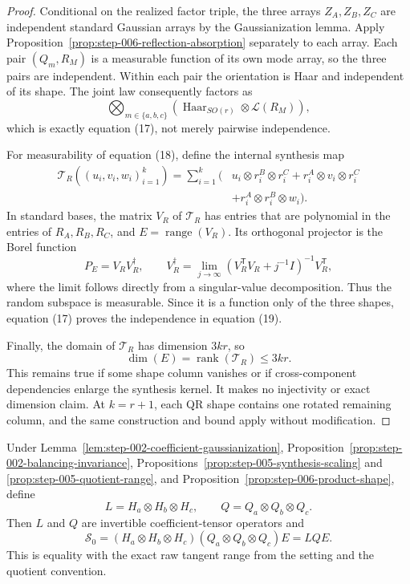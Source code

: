 \begin{proof}
Conditional on the realized factor triple, the
three arrays \(Z_A,Z_B,Z_C\) are independent standard Gaussian arrays by the
Gaussianization lemma. Apply
Proposition~\ref{prop:step-006-reflection-absorption} separately to each
array. Each pair \((Q_m,R_M)\) is a measurable function of its own mode array,
so the three pairs are independent. Within each pair the orientation is Haar
and independent of its shape. The joint law consequently factors as
\[
  \bigotimes_{m\in\{a,b,c\}}
    \left(\operatorname{Haar}_{SO(r)}\otimes\mathcal L(R_M)\right),
\]
which is exactly equation (17), not merely pairwise independence.

For measurability of equation (18), define the internal synthesis map
\[
\begin{aligned}
  \mathcal T_R((u_i,v_i,w_i)_{i=1}^k)
  =\sum_{i=1}^k(&u_i\otimes r_i^B\otimes r_i^C
    +r_i^A\otimes v_i\otimes r_i^C\\
    &+r_i^A\otimes r_i^B\otimes w_i).
\end{aligned}\tag{20}
\]
In standard bases, the matrix \(V_R\) of \(\mathcal T_R\) has entries that
are polynomial in the entries of \(R_A,R_B,R_C\), and
\(E=\operatorname{range}(V_R)\). Its orthogonal projector is the Borel
function
\[
  P_E=V_RV_R^\dagger,
  \qquad
  V_R^\dagger=\lim_{j\to\infty}
    (V_R^{\mathsf T}V_R+j^{-1}I)^{-1}V_R^{\mathsf T},          \tag{21}
\]
where the limit follows directly from a singular-value decomposition. Thus
the random subspace is measurable. Since it is a function only of the three
shapes, equation (17) proves the independence in equation (19).

Finally, the domain of \(\mathcal T_R\) has dimension \(3kr\), so
\[
  \dim(E)=\operatorname{rank}(\mathcal T_R)\le3kr.
\]
This remains true if some shape column vanishes or if cross-component
dependencies enlarge the synthesis kernel. It makes no injectivity or exact
dimension claim. At \(k=r+1\), each QR shape contains one rotated remaining
column, and the same construction and bound apply without modification.


\end{proof}


\begin{proposition}
\label{prop:step-006-exact-equivariance}
Under Lemma~\ref{lem:step-002-coefficient-gaussianization}, Proposition~\ref{prop:step-002-balancing-invariance}, Propositions~\ref{prop:step-005-synthesis-scaling} and
\ref{prop:step-005-quotient-range}, and
Proposition~\ref{prop:step-006-product-shape}, define
\[
  L=H_a\otimes H_b\otimes H_c,
  \qquad Q=Q_a\otimes Q_b\otimes Q_c.                         \tag{22}
\]
Then \(L\) and \(Q\) are invertible coefficient-tensor operators and
\[
  \boxed{
  \mathscr S_0
  =(H_a\otimes H_b\otimes H_c)
   (Q_a\otimes Q_b\otimes Q_c)E
  =LQE.}                                                       \tag{23}
\]
This is equality with the exact raw tangent range from the setting and the
quotient convention.

\end{proposition}

